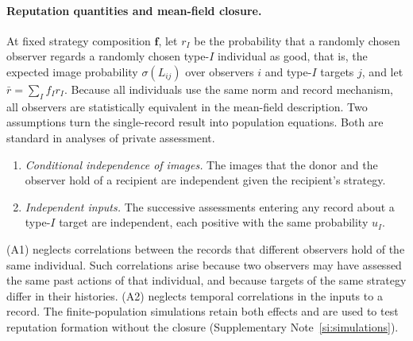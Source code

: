 \documentclass[fleqn,10pt]{wlscirep}
\theoremstyle{plain}
\begin{document}
\paragraph{Reputation quantities and mean-field closure.} At fixed strategy composition $\bm f$, let $r_I$ be the probability that a randomly chosen observer regards a randomly chosen type-$I$ individual as good, that is, the expected image probability $\sigma(L_{ij})$ over observers $i$ and type-$I$ targets $j$, and let $\bar r=\sum_If_Ir_I$. Because all individuals use the same norm and record mechanism, all observers are statistically equivalent in the mean-field description. Two assumptions turn the single-record result into population equations. Both are standard in analyses of private assessment.
\begin{enumerate}
\item[(A1)] \textit{Conditional independence of images.} The images that the donor and the observer hold of a recipient are independent given the recipient's strategy.
\item[(A2)] \textit{Independent inputs.} The successive assessments entering any record about a type-$I$ target are independent, each positive with the same probability $u_I$.
\end{enumerate}
(A1) neglects correlations between the records that different observers hold of the same individual. Such correlations arise because two observers may have assessed the same past actions of that individual, and because targets of the same strategy differ in their histories. (A2) neglects temporal correlations in the inputs to a record. The finite-population simulations retain both effects and are used to test reputation formation without the closure (Supplementary Note~\ref{si:simulations}).
\end{document}
